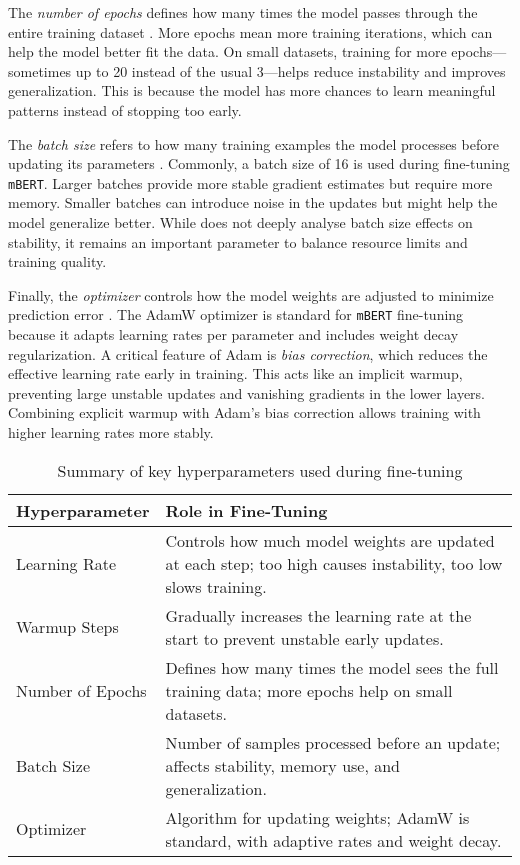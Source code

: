     The \textit{number of epochs} defines how many times the model passes through the entire training dataset \parencite{mosbachStabilityFinetuningBERT2021}. More epochs mean more training iterations, which can help the model better fit the data. On small datasets, training for more epochs—sometimes up to 20 instead of the usual 3—helps reduce instability and improves generalization. This is because the model has more chances to learn meaningful patterns instead of stopping too early.

    The \textit{batch size} refers to how many training examples the model processes before updating its parameters \parencite{mosbachStabilityFinetuningBERT2021}. Commonly, a batch size of 16 is used during fine-tuning \texttt{mBERT}. Larger batches provide more stable gradient estimates but require more memory. Smaller batches can introduce noise in the updates but might help the model generalize better. While \textcite{mosbachStabilityFinetuningBERT2021} does not deeply analyse batch size effects on stability, it remains an important parameter to balance resource limits and training quality.

    Finally, the \textit{optimizer} controls how the model weights are adjusted to minimize prediction error \parencite{mosbachStabilityFinetuningBERT2021}. The AdamW optimizer is standard for \texttt{mBERT} fine-tuning because it adapts learning rates per parameter and includes weight decay regularization. A critical feature of Adam is \textit{bias correction}, which reduces the effective learning rate early in training. This acts like an implicit warmup, preventing large unstable updates and vanishing gradients in the lower layers. Combining explicit warmup with Adam’s bias correction allows training with higher learning rates more stably.

    \vspace{0.6em}
    \begin{table}[h]
        \centering
        \begin{tabularx}{\textwidth}{l X}
        \toprule
        \textbf{Hyperparameter} & \textbf{Role in Fine-Tuning} \\
        \midrule
        Learning Rate & Controls how much model weights are updated at each step; too high causes instability, too low slows training. \\
        Warmup Steps & Gradually increases the learning rate at the start to prevent unstable early updates. \\
        Number of Epochs & Defines how many times the model sees the full training data; more epochs help on small datasets. \\
        Batch Size & Number of samples processed before an update; affects stability, memory use, and generalization. \\
        Optimizer & Algorithm for updating weights; AdamW is standard, with adaptive rates and weight decay. \\
        \bottomrule
        \end{tabularx}
        \caption{Summary of key hyperparameters used during fine-tuning}
    \end{table}



